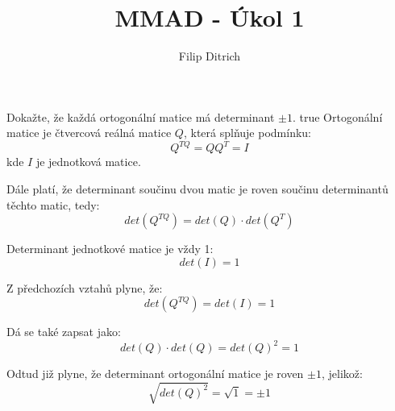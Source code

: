 \documentclass[10pt, a4paper]{ReportSheet}
\begin{document}
    \title{MMAD - Úkol 1}
    \author{Filip Ditrich}
    \date{
        \footnotesize{
        }
    }
    \maketitle

    \setcounter{tocdepth}{1}
    \pagestyle{plain}
    \renewcommand{\contentsname}{}
    \tableofcontents

    \begin{uloha}{1}{3}{
        Dokažte, že každá ortogonální matice má determinant $\pm 1$.
    }{true}
        Ortogonální matice je čtvercová reálná matice $Q$, která splňuje podmínku:
        \begin{equation*}
            Q^{TQ} = QQ^T = I
        \end{equation*}
        kde $I$ je jednotková matice.

        Dále platí, že determinant součinu dvou matic je roven součinu determinantů těchto matic, tedy:
        \begin{equation*}
            det(Q^{TQ}) = det(Q) \cdot det(Q^T)
        \end{equation*}

        Determinant jednotkové matice je vždy 1:
        \begin{equation*}
            det(I) = 1
        \end{equation*}

        Z předchozích vztahů plyne, že:
        \begin{equation*}
            det(Q^{TQ}) = det(I) = 1
        \end{equation*}

        Dá se také zapsat jako:
        \begin{equation*}
            det(Q) \cdot det(Q) = det(Q)^2 = 1
        \end{equation*}

        Odtud již plyne, že determinant ortogonální matice je roven $\pm 1$, jelikož:
        \begin{equation*}
            \sqrt{det(Q)^2} = \sqrt{1} = \pm 1
        \end{equation*}

    \end{uloha}
\end{document}
